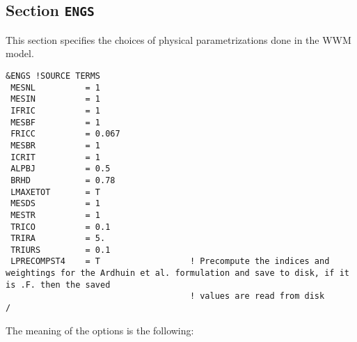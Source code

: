 \documentclass[12pt]{amsart}
\begin{document}
\subsection{Section {\tt ENGS}}
This section specifies the choices of physical parametrizations done in the WWM model.
\begin{verbatim}
&ENGS !SOURCE TERMS
 MESNL          = 1      
 MESIN          = 1      
 IFRIC          = 1              
 MESBF          = 1              
 FRICC          = 0.067          
 MESBR          = 1              
 ICRIT          = 1              
 ALPBJ          = 0.5            
 BRHD           = 0.78           
 LMAXETOT       = T              
 MESDS          = 1              
 MESTR          = 1          
 TRICO          = 0.1        
 TRIRA          = 5.       
 TRIURS         = 0.1      
 LPRECOMPST4    = T                  ! Precompute the indices and weightings for the Ardhuin et al. formulation and save to disk, if it is .F. then the saved
                                     ! values are read from disk
/
\end{verbatim}
The meaning of the options is the following:
\end{document}
